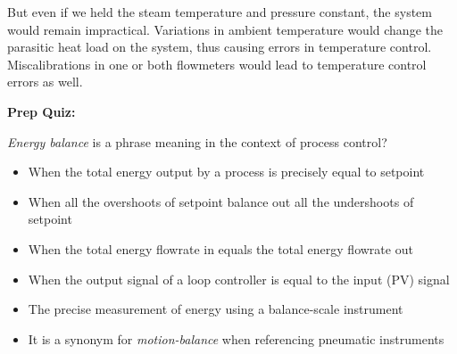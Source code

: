 But even if we held the steam temperature and pressure constant, the system would remain impractical.  Variations in ambient temperature would change the parasitic heat load on the system, thus causing errors in temperature control.  Miscalibrations in one or both flowmeters would lead to temperature control errors as well.

\vfil \eject

\noindent
{\bf Prep Quiz:}

{\it Energy balance} is a phrase meaning  in the context of process control?

\begin{itemize}
\item{} When the total energy output by a process is precisely equal to setpoint
\vskip 5pt 
\item{} When all the overshoots of setpoint balance out all the undershoots of setpoint
\vskip 5pt 
\item{} When the total energy flowrate in equals the total energy flowrate out
\vskip 5pt 
\item{} When the output signal of a loop controller is equal to the input (PV) signal
\vskip 5pt 
\item{} The precise measurement of energy using a balance-scale instrument
\vskip 5pt 
\item{} It is a synonym for {\it motion-balance} when referencing pneumatic instruments
\end{itemize}




